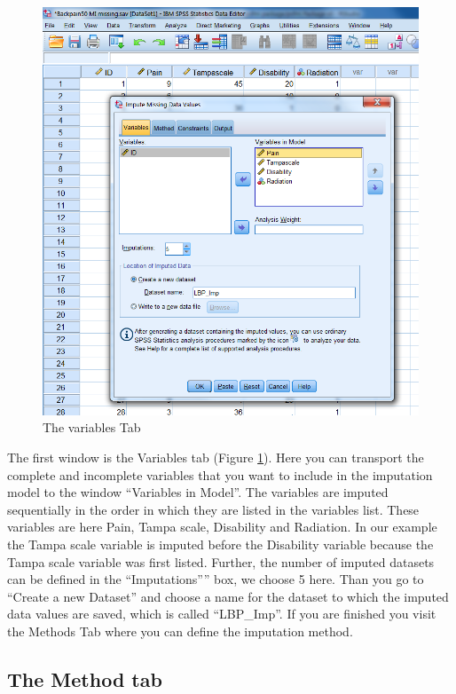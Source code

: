 \documentclass[
]{book}
\begin{document}
\begin{figure}

{\centering \includegraphics[width=0.9\linewidth]{images/fig4.6} 

}

\caption{The variables Tab}\label{fig:fig4-6}
\end{figure}

The first window is the Variables tab (Figure \ref{fig:fig4-6}). Here you can transport the complete and incomplete variables that you want to include in the imputation model to the window ``Variables in Model''. The variables are imputed sequentially in the order in which they are listed in the variables list. These variables are here Pain, Tampa scale, Disability and Radiation. In our example the Tampa scale variable is imputed before the Disability variable because the Tampa scale variable was first listed. Further, the number of imputed datasets can be defined in the ``Imputations'''' box, we choose 5 here. Than you go to ``Create a new Dataset'' and choose a name for the dataset to which the imputed data values are saved, which is called ``LBP\_Imp''. If you are finished you visit the Methods Tab where you can define the imputation method.

\hypertarget{the-method-tab}{%
\subsection{The Method tab}\label{the-method-tab}}
\end{document}
